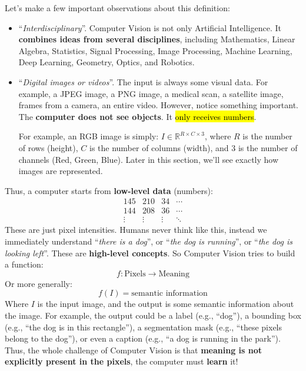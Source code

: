 \highspace
Let's make a few important observations about this definition:
\begin{itemize}
    \item ``\emph{Interdisciplinary}''. Computer Vision is not only Artificial Intelligence. It \textbf{combines ideas from several disciplines}, including Mathematics, Linear Algebra, Statistics, Signal Processing, Image Processing, Machine Learning, Deep Learning, Geometry, Optics, and Robotics.
    
    
    \item ``\emph{Digital images or videos}''. The input is always some visual data. For example, a JPEG image, a PNG image, a medical scan, a satellite image, frames from a camera, an entire video. However, notice something important. The \textbf{computer does not see objects}. It \hl{only receives numbers}.
    
    For example, an RGB image is simply: $I \in \mathbb{R}^{R \times C \times 3}$, where $R$ is the number of rows (height), $C$ is the number of columns (width), and $3$ is the number of channels (Red, Green, Blue). Later in this section, we'll see exactly how images are represented.
\end{itemize}
Thus, a computer starts from \textbf{low-level data} (numbers):
\begin{equation*}
    \begin{matrix}
        145 & 210 & 34 & \cdots \\
        144 & 208 & 36 & \cdots \\
        \vdots & \vdots & \vdots & \ddots
    \end{matrix}
\end{equation*}
These are just pixel intensities. Humans never think like this, instead we immediately understand ``\emph{there is a dog}'', or ``\emph{the dog is running}'', or ``\emph{the dog is looking left}''. These are \textbf{high-level concepts}. So Computer Vision tries to build a function:
\begin{equation*}
    f: \text{Pixels} \longrightarrow \text{Meaning}
\end{equation*}
Or more generally:
\begin{equation*}
    f(I) = \text{semantic information}
\end{equation*}
Where $I$ is the input image, and the output is some semantic information about the image. For example, the output could be a label (e.g., ``dog''), a bounding box (e.g., ``the dog is in this rectangle''), a segmentation mask (e.g., ``these pixels belong to the dog''), or even a caption (e.g., ``a dog is running in the park''). Thus, the whole challenge of Computer Vision is that \textbf{meaning is not explicitly present in the pixels}, the computer must \textbf{learn} it!
